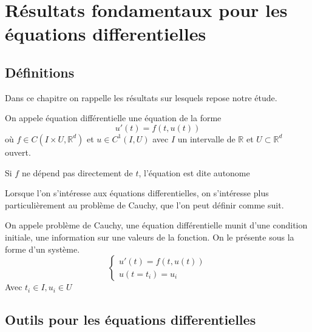\documentclass{article}
\newcommand{\R}{\mathbb{R}}
\newtheorem[M , nocut]{prop}{Proposition}[section]
\newtheorem[M , nocut]{definition}{Définition}
\newtheorem[M , nocut]{lemme}{Lemme}
\newtheorem[L , nocut]{thm}{Théoreme}
\newtheorem[M , nocut]{cor}{Corollaire}
\begin{document}
\newpage
\section{Résultats fondamentaux pour les équations differentielles}

\subsection{Définitions}
Dans ce chapitre on rappelle les résultats sur lesquels repose notre étude.
\begin{definition}
    On appele équation différentielle une équation de la forme
    \[
      u'(t) = f(t,u(t))  
    \]où $f \in C(I\times U,\R^d)$ et $u \in C^1(I,U)$ avec $I$ un intervalle de $\R$ et $U \subset \R^d$ ouvert.
\end{definition}
\begin{example}[Remarque]
    Si $f$ ne dépend pas directement de $t$, l'équation est dite autonome
\end{example}
Lorsque l'on s'intéresse aux équations differentielles, on s'intéresse plus particulièrement au problème de Cauchy, que l'on peut définir comme suit.
\begin{definition}
    On appele problème de Cauchy, une équation différentielle munit d'une condition initiale, une information sur une valeurs de la fonction. On le présente sous la forme d'un système.
    \[ \left\{ \begin{array}{l}
        u'(t) = f(t,u(t)) \\ 
        u(t=t_i) = u_i
    \end{array}\right. \]
    Avec $t_i\in I, u_i \in U$
\end{definition}

\subsection{Outils pour les équations differentielles}
\end{document}
